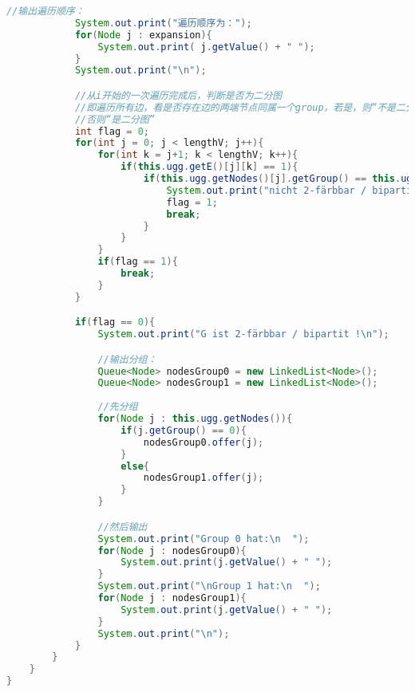 \begin{lstlisting}[language = java]
            //输出遍历顺序：
            System.out.print("遍历顺序为：");
            for(Node j : expansion){
                System.out.print( j.getValue() + " ");
            }
            System.out.print("\n");

            //从i开始的一次遍历完成后，判断是否为二分图
            //即遍历所有边，看是否存在边的两端节点同属一个group，若是，则“不是二分图”
            //否则“是二分图”
            int flag = 0;
            for(int j = 0; j < lengthV; j++){
                for(int k = j+1; k < lengthV; k++){
                    if(this.ugg.getE()[j][k] == 1){
                        if(this.ugg.getNodes()[j].getGroup() == this.ugg.getNodes()[k].getGroup() ){
                            System.out.print("nicht 2-färbbar / bipartit\n");
                            flag = 1;
                            break;
                        }
                    }
                }
                if(flag == 1){
                    break;
                }
            }

            if(flag == 0){
                System.out.print("G ist 2-färbbar / bipartit !\n");

                //输出分组：
                Queue<Node> nodesGroup0 = new LinkedList<Node>();       //该组存储组0的节点
                Queue<Node> nodesGroup1 = new LinkedList<Node>();       //该组存储组1的节点
                
                //先分组
                for(Node j : this.ugg.getNodes()){
                    if(j.getGroup() == 0){
                        nodesGroup0.offer(j);
                    }
                    else{
                        nodesGroup1.offer(j);
                    }
                }

                //然后输出
                System.out.print("Group 0 hat:\n  ");
                for(Node j : nodesGroup0){
                    System.out.print(j.getValue() + " ");
                }
                System.out.print("\nGroup 1 hat:\n  ");
                for(Node j : nodesGroup1){
                    System.out.print(j.getValue() + " ");
                }
                System.out.print("\n");
            }
        }
    }
}
\end{lstlisting}

